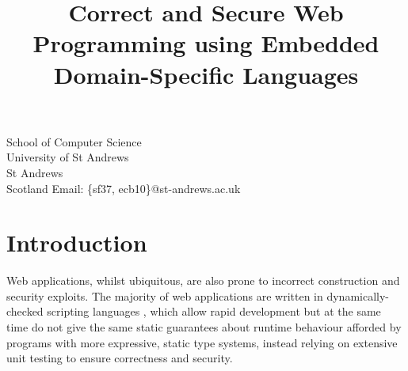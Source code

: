 \documentclass[preprint]{sigplanconf}
\begin{document}
\newcommand{\idris}{\textsc{Idris}}
\setlength{\pdfpageheight}{\paperheight}
\setlength{\pdfpagewidth}{\paperwidth}





\preprintfooter{}   %

\title{Correct and Secure Web Programming using 
Embedded Domain-Specific Languages}

           {School of Computer Science \\ University of St Andrews \\ St Andrews \\ Scotland}
           {Email: \{sf37, ecb10\}@st-andrews.ac.uk}

\maketitle

\begin{abstract}

 
\end{abstract}




\section{Introduction}
Web applications, whilst ubiquitous, are also prone to incorrect construction and security exploits. The majority of web applications are written in dynamically-checked scripting languages \cite{}, which allow rapid development but at the same time do not give the same static guarantees about runtime behaviour afforded by programs with more expressive, static type systems, instead relying on extensive unit testing to ensure correctness and security. 
\end{document}
